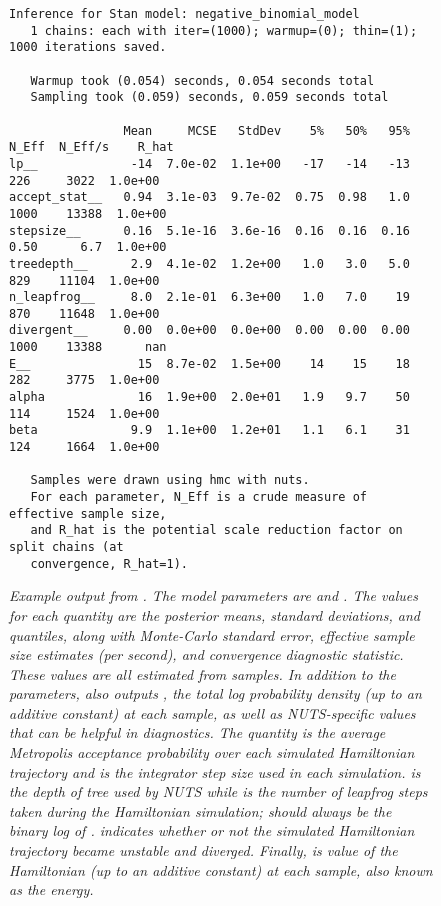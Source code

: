 \begin{figure}
\begin{Verbatim}[fontsize=\footnotesize]
   Inference for Stan model: negative_binomial_model
   1 chains: each with iter=(1000); warmup=(0); thin=(1); 1000 iterations saved.

   Warmup took (0.054) seconds, 0.054 seconds total
   Sampling took (0.059) seconds, 0.059 seconds total

                Mean     MCSE   StdDev    5%   50%   95%  N_Eff  N_Eff/s    R_hat
lp__             -14  7.0e-02  1.1e+00   -17   -14   -13    226     3022  1.0e+00
accept_stat__   0.94  3.1e-03  9.7e-02  0.75  0.98   1.0   1000    13388  1.0e+00
stepsize__      0.16  5.1e-16  3.6e-16  0.16  0.16  0.16   0.50      6.7  1.0e+00
treedepth__      2.9  4.1e-02  1.2e+00   1.0   3.0   5.0    829    11104  1.0e+00
n_leapfrog__     8.0  2.1e-01  6.3e+00   1.0   7.0    19    870    11648  1.0e+00
divergent__     0.00  0.0e+00  0.0e+00  0.00  0.00  0.00   1000    13388      nan
E__               15  8.7e-02  1.5e+00    14    15    18    282     3775  1.0e+00
alpha             16  1.9e+00  2.0e+01   1.9   9.7    50    114     1524  1.0e+00
beta             9.9  1.1e+00  1.2e+01   1.1   6.1    31    124     1664  1.0e+00

   Samples were drawn using hmc with nuts.
   For each parameter, N_Eff is a crude measure of effective sample size,
   and R_hat is the potential scale reduction factor on split chains (at 
   convergence, R_hat=1).
\end{Verbatim}
\vspace*{-6pt}
\caption{\small\it Example output from .  The model
  parameters are  and .  The values for each
  quantity are the posterior means, standard deviations, and
  quantiles, along with Monte-Carlo standard error, effective sample
  size estimates (per second), and convergence diagnostic statistic.
  These values are all estimated from samples. In addition to the
  parameters,  also outputs , 
  the total log probability density (up to an additive constant) at each sample,
  as well as NUTS-specific values that can be helpful in diagnostics. 
  The quantity  is the average Metropolis acceptance 
  probability over each simulated Hamiltonian trajectory and  
  is the integrator step size used in each simulation.   is the 
  depth of tree used by NUTS while  is the number of leapfrog 
  steps taken during the Hamiltonian simulation;  should always
  be the binary log of .   indicates
  whether or not the simulated Hamiltonian trajectory became unstable and
  diverged.  Finally,  is value of the Hamiltonian (up to an additive
  constant) at each sample, also known as the energy.
  }
\label{bin-stansummary-eg.figure}
\end{figure}
